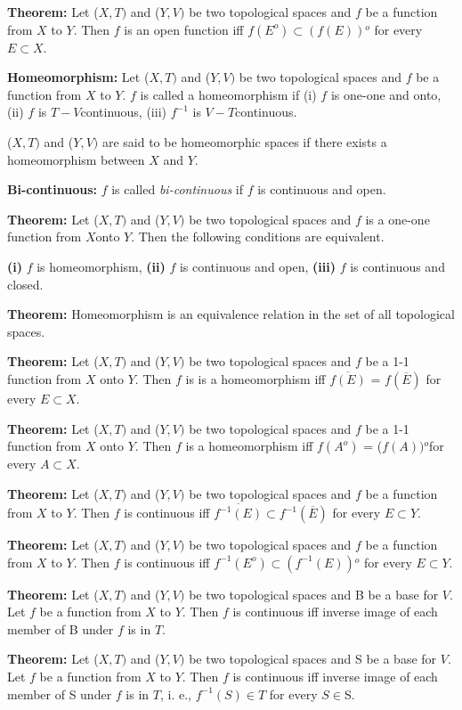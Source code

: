 \documentclass[12pt]{amsart}
\begin{document}
\textbf{Theorem:} Let ($X, T )$ and ($Y, V)$ be two topological spaces and $f$ be a function 
from $X$ to $Y$. Then $f$ is an open function iff $f (E^{o})\subset (f (E))$$^{o}$ for 
every $E \subset X$.

\textbf{Homeomorphism:} Let ($X, T )$ and ($Y, V )$ be two topological spaces and $f$ be a 
function from $X$ to $Y$. $f$ is called a homeomorphism if (i) $f$ is one-one and onto, 
(ii) $f$ is $T-V $continuous, (iii) $f^{-1}$ is $V-T $continuous. 

($X, T)$ and ($Y, V)$ are said to be homeomorphic spaces if there exists a homeomorphism 
between $X$ and $Y$.

\textbf{Bi-continuous:} $f$ is called \textit{bi-continuous} if $f$ is continuous and open.

\textbf{Theorem:} Let ($X, T )$ and ($Y, V)$ be two topological spaces and $f$ is a one-one 
function from $X $onto $Y$. Then the following conditions are equivalent.

\textbf{(i)} $f$ is homeomorphism, \textbf{(ii)} $f$ is continuous and open, 
\textbf{(iii)} $f$ is continuous and closed.

\textbf{Theorem:} Homeomorphism is an equivalence relation in the set of all 
topological spaces.

\textbf{Theorem:} Let ($X, T )$ and ($Y, V)$ be two topological spaces and $f$ be a 1-1 
function from $X$ onto $Y$. Then $f$ is is a homeomorphism iff $\overline {f(E)} $ = 
$f(\overline E )$ for every $E\subset X$.

\textbf{Theorem:} Let ($X, T )$ and ($Y, V)$ be two topological spaces and $f$ be a 1-1 
function from $X$ onto $Y$. Then $f$ is a homeomorphism iff $f (A^{o})$ = ($f (A))$$^{o}$for 
every $A \subset X$.

\textbf{Theorem:} Let ($X, T )$ and ($Y, V)$ be two topological spaces and $f$ be a function 
from $X$ to $Y$. Then $f$ is continuous iff $\overline {f^{-1}(E)} \subset 
f^{-1}(\overline E )$ for every $E\subset Y$.

\textbf{Theorem:} Let ($X, T )$ and ($Y, V)$ be two topological spaces and $f$ be a function 
from $X$ to $Y$. Then $f$ is continuous iff $f^{-1}(E^{o})\subset 
(f^{-1}(E))$$^{o}$ for every $E\subset Y$.

\textbf{Theorem:} Let ($X, T )$ and ($Y, V)$ be two topological spaces and B be a base 
for $V$. Let $f$ be a function from $X$ to $Y$. Then $f$ is continuous iff inverse image of 
each member of B under $f$ is in $T$.

\textbf{Theorem:} Let ($X, T )$ and ($Y, V)$ be two topological spaces and S be a base 
for $V$. Let $f$ be a function from $X$ to $Y$. Then $f$ is continuous iff inverse image of 
each member of S under $f$ is in $T$, i. e., $f^{-1}(S)\in T$ for every $S\in $S.
\end{document}
